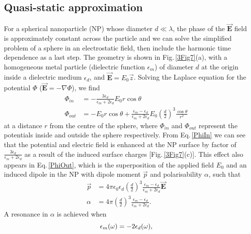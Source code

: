 \subsection{Quasi-static approximation}
For a spherical nanoparticle (NP) whose diameter $d\ll\lambda$, the phase of the $\vec{\mathbf{E}}$ field is approximately constant across the particle and we can solve the simplified problem of a sphere in an electrostatic field, then include the harmonic time dependence as a last step. The geometry is shown in Fig.\,\ref{3Fig7}(a), with a homogeneous metal particle (dielectric function $\epsilon_m$) of diameter $d$ at the origin inside a dielectric medium $\epsilon_d$, and $\vec{\mathbf{E}} = E_0\vec{z}$. Solving the Laplace equation for the potential $\Phi$ ($\vec{\mathbf{E}} = -\nabla\Phi$), we find
\begin{subequations}
\label{NPlaplace}
\begin{align}
\Phi_{in} &= -\frac{3\epsilon_d}{\epsilon_m+2\epsilon_d}E_0r\cos\theta \label{PhiIn}\\
\Phi_{out} &= -E_0r\cos\theta+\frac{\epsilon_m-\epsilon_d}{\epsilon_m+2\epsilon_d}E_0\left(\frac{d}{2}\right)^3\frac{\cos\theta}{r^2} \label{PhiOut}
\end{align}
\end{subequations}
at a distance $r$ from the centre of the sphere, where $\Phi_{in}$ and $\Phi_{out}$ represent the potentials inside and outside the sphere respectively. From Eq.\,\ref{PhiIn} we can see that the potential and electric field is enhanced at the NP surface by factor of $\frac{3\epsilon_d}{\epsilon_m+2\epsilon_d}$ as a result of the induced surface charges [Fig.\,\ref{3Fig7}(c)]. This effect also appears in Eq.\,\ref{PhiOut}, which is the superposition of the applied field $E_0$ and an induced dipole in the NP with dipole moment $\vec{p}$ and polarisability $\alpha$, such that
\begin{subequations}
\label{NPdipole}
\begin{align}
\vec{p} &=4\pi\epsilon_0\epsilon_d\left(\frac{d}{2}\right)^3\frac{\epsilon_m-\epsilon_d}{\epsilon_m+2\epsilon_d}\vec{\mathbf{E}} \label{NPmoment}\\
\alpha &= 4\pi\left(\frac{d}{2}\right)^3\frac{\epsilon_m-\epsilon_d}{\epsilon_m+2\epsilon_d} \label{NPpolarisability} .
\end{align}
\end{subequations}
A resonance in $\alpha$ is achieved when 
\begin{equation}
\centering
\epsilon_m(\omega) = -2\epsilon_d(\omega) ,
\label{Frolich}
\end{equation}
